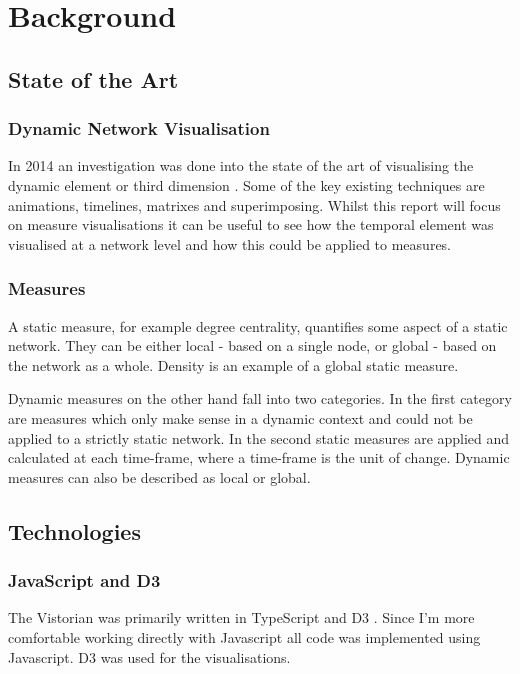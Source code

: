 
\chapter{Background}

\section{State of the Art}
\subsection{Dynamic Network Visualisation}

In 2014 an investigation was done into the state of the art of visualising the dynamic element or third dimension \cite{tsotaivg}. Some of the key existing techniques are animations, timelines, matrixes and superimposing.  Whilst this report will focus on measure visualisations it can be useful to see how the temporal element was visualised at a network level and how this could be applied to measures. 

\subsection{Measures}
A static measure, for example degree centrality, quantifies some aspect of a static network. They can be either local - based on a single node, or global - based on the network as a whole. Density is an example of a global static measure. 

Dynamic measures on the other hand fall into two categories. In the first category are measures which only make sense in a dynamic context and could not be applied to a strictly static network. In the second static measures are applied and calculated at each time-frame, where a time-frame is the unit of change. %
Dynamic measures can also be described as local or global.



\section{Technologies}
\subsection{JavaScript and D3}
\label{sec:sec24}
The Vistorian was primarily written in TypeScript and D3 \cite{d3site}. Since I'm more comfortable working directly with Javascript all code was implemented using Javascript. D3 was used for the visualisations.

